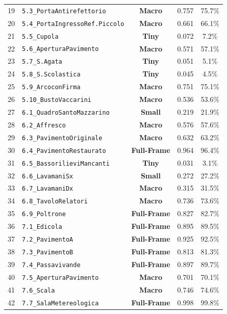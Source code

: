 \begin{longtable}{cp{5.6cm}ccc}
19 & \texttt{5.3\_PortaAntirefettorio} & \textbf{Macro} & 0.757 & 75.7\% \\
20 & \texttt{5.4\_PortaIngressoRef.Piccolo} & \textbf{Macro} & 0.661 & 66.1\% \\
21 & \texttt{5.5\_Cupola} & \textbf{Tiny} & 0.072 & 7.2\% \\
22 & \texttt{5.6\_AperturaPavimento} & \textbf{Macro} & 0.571 & 57.1\% \\
23 & \texttt{5.7\_S.Agata} & \textbf{Tiny} & 0.051 & 5.1\% \\
24 & \texttt{5.8\_S.Scolastica} & \textbf{Tiny} & 0.045 & 4.5\% \\
25 & \texttt{5.9\_ArcoconFirma} & \textbf{Macro} & 0.751 & 75.1\% \\
26 & \texttt{5.10\_BustoVaccarini} & \textbf{Macro} & 0.536 & 53.6\% \\
27 & \texttt{6.1\_QuadroSantoMazzarino} & \textbf{Small} & 0.219 & 21.9\% \\
28 & \texttt{6.2\_Affresco} & \textbf{Macro} & 0.576 & 57.6\% \\
29 & \texttt{6.3\_PavimentoOriginale} & \textbf{Macro} & 0.632 & 63.2\% \\
30 & \texttt{6.4\_PavimentoRestaurato} & \textbf{Full-Frame} & 0.964 & 96.4\% \\
31 & \texttt{6.5\_BassorilieviMancanti} & \textbf{Tiny} & 0.031 & 3.1\% \\
32 & \texttt{6.6\_LavamaniSx} & \textbf{Small} & 0.272 & 27.2\% \\
33 & \texttt{6.7\_LavamaniDx} & \textbf{Macro} & 0.315 & 31.5\% \\
34 & \texttt{6.8\_TavoloRelatori} & \textbf{Macro} & 0.736 & 73.6\% \\
35 & \texttt{6.9\_Poltrone} & \textbf{Full-Frame} & 0.827 & 82.7\% \\
36 & \texttt{7.1\_Edicola} & \textbf{Full-Frame} & 0.895 & 89.5\% \\
37 & \texttt{7.2\_PavimentoA} & \textbf{Full-Frame} & 0.925 & 92.5\% \\
38 & \texttt{7.3\_PavimentoB} & \textbf{Full-Frame} & 0.813 & 81.3\% \\
39 & \texttt{7.4\_Passavivande} & \textbf{Full-Frame} & 0.897 & 89.7\% \\
40 & \texttt{7.5\_AperturaPavimento} & \textbf{Macro} & 0.701 & 70.1\% \\
41 & \texttt{7.6\_Scala} & \textbf{Macro} & 0.746 & 74.6\% \\
42 & \texttt{7.7\_SalaMetereologica} & \textbf{Full-Frame} & 0.998 & 99.8\% \\

\end{longtable}
